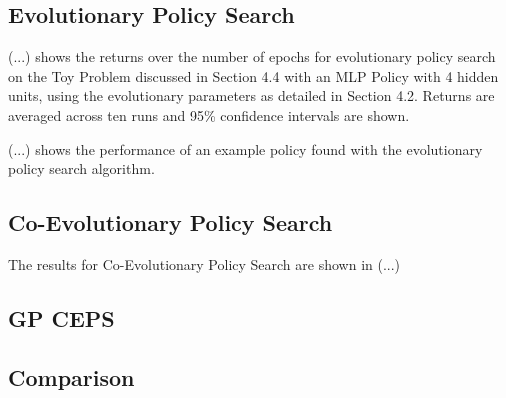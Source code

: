 \subsection{Evolutionary Policy Search}

(...) shows the returns over the number of epochs for evolutionary policy search on the Toy Problem discussed in Section 4.4 with an MLP Policy with 4 hidden units, using the evolutionary parameters as detailed in Section 4.2. Returns are averaged across ten runs and 95\% confidence intervals are shown.


(...) shows the performance of an example policy found with the evolutionary policy search algorithm. 

\subsection{Co-Evolutionary Policy Search}

The results for Co-Evolutionary Policy Search are shown in (...)

\subsection{GP CEPS}

\subsection{Comparison}

